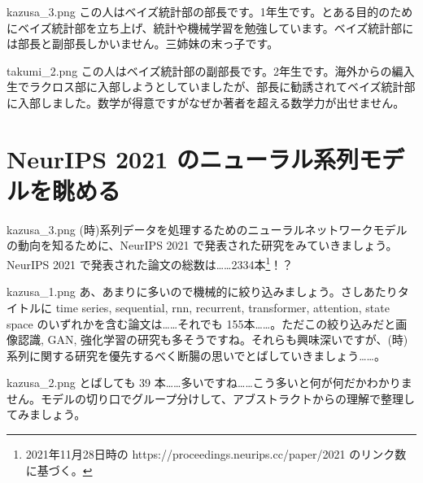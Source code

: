 \documentclass[b5paper,xelatex,ja=standard,10pt]{bxjsarticle}
\begin{document}
\vspace{3pt}
\begin{SERIFU}[colback=White, colbacktitle=PaleIris2, top=-1pt, bottom=0pt, left=18pt, right=10pt]{kazusa_3.png}
\small
この人はベイズ統計部の部長です。1年生です。とある目的のためにベイズ統計部を立ち上げ、統計や機械学習を勉強しています。ベイズ統計部には部長と副部長しかいません。三姉妹の末っ子です。
\end{SERIFU}
\begin{SERIFU}[colback=White, colbacktitle=PaleGold2, top=-1pt, bottom=0pt, left=18pt, right=10pt]{takumi_2.png}
\small
この人はベイズ統計部の副部長です。2年生です。海外からの編入生でラクロス部に入部しようとしていましたが、部長に勧誘されてベイズ統計部に入部しました。数学が得意ですがなぜか著者を超える数学力が出せません。
\end{SERIFU}
\vspace{4pt}


\section*{NeurIPS 2021 のニューラル系列モデルを眺める}
\vspace{5pt}

\begin{SERIFU}[colback=PaleIris, colbacktitle=PaleIris2]{kazusa_3.png}
(時)系列データを処理するためのニューラルネットワークモデルの動向を知るために、NeurIPS 2021 で発表された研究をみていきましょう。NeurIPS 2021 で発表された論文の総数は……2334本\footnote{2021年11月28日時の https://proceedings.neurips.cc/paper/2021 のリンク数に基づく。}！？
\end{SERIFU}

\begin{SERIFU}[colback=PaleIris, colbacktitle=PaleIris2]{kazusa_1.png}
あ、あまりに多いので機械的に絞り込みましょう。さしあたりタイトルに time series, sequential, rnn, recurrent, transformer, attention, state space のいずれかを含む論文は……それでも 155本……。ただこの絞り込みだと画像認識, GAN, 強化学習の研究も多そうですね。それらも興味深いですが、(時)系列に関する研究を優先するべく断腸の思いでとばしていきましょう……。
\end{SERIFU}

\begin{SERIFU}[colback=PaleIris, colbacktitle=PaleIris2]{kazusa_2.png}
とばしても 39 本……多いですね……こう多いと何が何だかわかりません。モデルの切り口でグループ分けして、アブストラクトからの理解で整理してみましょう。
\end{SERIFU}
\end{document}
